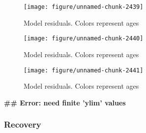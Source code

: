 \documentclass[a4paper]{article}\usepackage{graphicx, color}
\makeatletter
\def\maxwidth{ %
  \ifdim\Gin@nat@width>\linewidth
    \linewidth
  \else
    \Gin@nat@width
  \fi
}
\newenvironment{kframe}{%
 \def\at@end@of@kframe{}%
 \ifinner\ifhmode%
  \def\at@end@of@kframe{\end{minipage}}%
  \begin{minipage}{\columnwidth}%
 \fi\fi%
 \def\FrameCommand##1{\hskip\@totalleftmargin \hskip-\fboxsep
 \colorbox{shadecolor}{##1}\hskip-\fboxsep
     \hskip-\linewidth \hskip-\@totalleftmargin \hskip\columnwidth}%
 \MakeFramed {\advance\hsize-\width
   \@totalleftmargin\z@ \linewidth\hsize
   \@setminipage}}%
 {\par\unskip\endMakeFramed%
 \at@end@of@kframe}
\newenvironment{knitrout}{}{} %
\makeatother
\begin{document}
\begin{knitrout}
\begin{figure}[H]
{\centering \texttt{[image: figure/unnamed-chunk-2439]} 

}

\caption[Model residuals]{Model residuals. Colors represent ages\label{fig:unnamed-chunk-2439}}
\end{figure}
\begin{figure}[H]


{\centering \texttt{[image: figure/unnamed-chunk-2440]} 

}

\caption[Model residuals]{Model residuals. Colors represent ages\label{fig:unnamed-chunk-2440}}
\end{figure}
\begin{figure}[H]


{\centering \texttt{[image: figure/unnamed-chunk-2441]} 

}

\caption[Model residuals]{Model residuals. Colors represent ages\label{fig:unnamed-chunk-2441}}
\end{figure}
\begin{kframe}

{\ttfamily\noindent\bfseries\textcolor{errorcolor}{\#\# Error: need finite 'ylim' values}}\end{kframe}
\end{knitrout}


\subsubsection*{Recovery}
\end{document}
